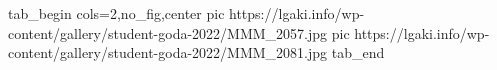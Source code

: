  
 
 
 
 


\ifcmt
  tab_begin cols=2,no_fig,center
     pic https://lgaki.info/wp-content/gallery/student-goda-2022/MMM_2057.jpg
		 pic https://lgaki.info/wp-content/gallery/student-goda-2022/MMM_2081.jpg
  tab_end
\fi
